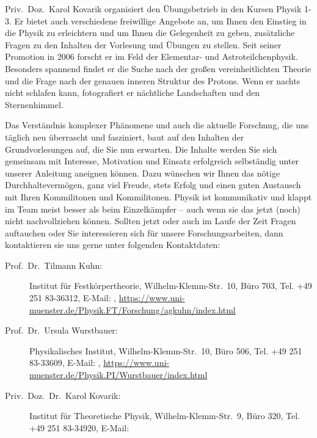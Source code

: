 \begin{multicols}{2}
Priv.\ Doz.\ Karol Kovarik organisiert den Übungsbetrieb in den Kursen Physik 1-3. Er bietet auch 
verschiedene freiwillige Angebote an, um Ihnen den Einstieg in die Physik zu erleichtern und um Ihnen 
die Gelegenheit zu geben, zusätzliche Fragen zu den Inhalten der Vorlesung und Übungen zu stellen. 
Seit seiner Promotion in 2006 forscht er im Feld der Elementar- und Astroteilchenphysik. Besonders 
spannend findet er die Suche nach der großen vereinheitlichten Theorie und die Frage nach der 
genauen inneren Struktur des Protons. Wenn er nachts nicht schlafen kann, fotografiert er nächtliche 
Landschaften und den Sternenhimmel. 

Das Verständnis komplexer Phänomene und auch die aktuelle Forschung, die uns täglich neu 
überrascht und fasziniert, baut auf den Inhalten der Grundvorlesungen auf, die Sie nun erwarten. Die 
Inhalte werden Sie sich gemeinsam mit Interesse, Motivation und Einsatz erfolgreich selbständig unter 
unserer Anleitung aneignen können. Dazu wünschen wir Ihnen das nötige Durchhaltevermögen, ganz 
viel Freude, stets Erfolg und einen guten Austausch mit Ihren Kommilitonen und Kommilitonen. Physik 
ist kommunikativ und klappt im Team meist besser als beim Einzelkämpfer – auch wenn sie das jetzt (noch) 
nicht nachvollziehen können. Sollten jetzt oder auch im Laufe der Zeit Fragen auftauchen oder Sie 
interessieren sich für unsere Forschungsarbeiten, dann kontaktieren sie uns gerne unter folgenden 
Kontaktdaten: 

\begin{description}
	\item[Prof.\ Dr.\ Tilmann Kuhn:] Institut für Festkörpertheorie, Wilhelm-Klemm-Str.\ 10, Büro 703, Tel. +49 
		251 83-36312, E-Mail: , \url{https://www.uni-muenster.de/Physik.FT/Forschung/agkuhn/index.html}

	\item[Prof.\ Dr.\ Ursula Wurstbauer:] Physikalisches Institut, Wilhelm-Klemm-Str.\ 10, Büro 506, Tel. +49 251 
		83-33609, E-Mail: , \url{https://www.uni-muenster.de/Physik.PI/Wurstbauer/index.html}

	\item[Priv.\ Doz.\ Dr.\ Karol Kovarik:] Institut für Theoretische Physik, Wilhelm-Klemm-Str.\ 9, Büro 320, Tel. 
		+49 251 83-34920, E-Mail: 
\end{description}


\end{multicols}
